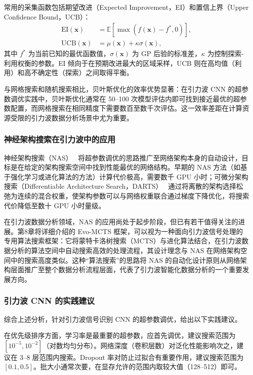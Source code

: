 常用的采集函数包括期望改进（Expected Improvement，EI）和置信上界（Upper Confidence Bound，UCB）：
\begin{align}
  \text{EI}(\mathbf{x}) &= \mathbb{E}\!\left[\max\!\left(f(\mathbf{x}) - f^*, 0\right)\right], \\
  \text{UCB}(\mathbf{x}) &= \mu(\mathbf{x}) + \kappa \sigma(\mathbf{x}),
\end{align}
其中 $f^*$ 为当前已知的最优函数值，$\sigma(\mathbf{x})$ 为 GP 后验的标准差，$\kappa$ 为控制探索-利用权衡的参数。EI 倾向于在预期改进最大的区域采样，UCB 则在高均值（利用）和高不确定性（探索）之间取得平衡。

与网格搜索和随机搜索相比，贝叶斯优化的效率优势显著：在引力波 CNN 的超参数调优实践中，贝叶斯优化通常在 50--100 次模型评估内即可找到接近最优的超参数配置，而网格搜索在相同精度下需要数百至数千次评估。这一效率差距在计算资源受限的引力波数据分析场景中尤为重要。

\subsubsection*{神经架构搜索在引力波中的应用}

神经架构搜索（NAS）~\cite{Elsken2019NASsurvey} 将超参数调优的思路推广至网络架构本身的自动设计，目标是在给定的架构搜索空间中找到性能最优的网络结构。早期的 NAS 方法（如基于强化学习或进化算法的方法）计算代价极高，需要数千 GPU 小时；可微分架构搜索（Differentiable Architecture Search，DARTS）~\cite{Liu2019DARTS} 通过将离散的架构选择松弛为连续的混合权重，使架构参数可以与网络权重联合通过梯度下降优化，将搜索代价降低至数十 GPU 小时量级。

在引力波数据分析领域，NAS 的应用尚处于起步阶段，但已有若干值得关注的进展。第8章将详细介绍的 Evo-MCTS 框架，可以视为一种面向引力波信号处理的专用算法搜索框架：它将蒙特卡洛树搜索（MCTS）与进化算法结合，在引力波数据分析的算法空间中自动搜索高效的处理流程，其设计理念与 NAS 在网络架构空间中的搜索高度类似。这种“算法搜索”的思路将 NAS 的自动化设计原则从网络架构层面推广至整个数据分析流程层面，代表了引力波智能化数据分析的一个重要发展方向。

\subsubsection*{引力波 CNN 的实践建议}

综合上述分析，针对引力波信号识别 CNN 的超参数调优，给出以下实践建议。

在优先级排序方面，学习率是最重要的超参数，应首先调优，建议搜索范围为 $[10^{-5}, 10^{-2}]$（对数均匀分布）。网络深度（卷积层数）对泛化性能影响次之，建议在 3--8 层范围内搜索。Dropout 率对防止过拟合有重要作用，建议搜索范围为 $[0.1, 0.5]$。批大小通常次要，在显存允许的范围内取较大值（128--512）即可。

